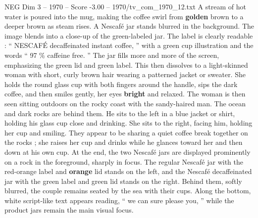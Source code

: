 \begin{textsample}{NEG Dim 3 – 1970 – Score -3.00 – 1970/tv\_com\_1970\_12.txt}
A stream of hot water is poured into the mug, making the coffee swirl from \textbf{golden} brown to a deeper brown as steam rises.
A Nescafé jar stands blurred in the background.
The image blends into a close-up of the green-labeled jar.
The label is clearly readable : “ NESCAFÉ decaffeinated instant coffee, ” with a green cup illustration and the words “ 97 \% caffeine free. ” The jar fills more and more of the screen, emphasizing the green lid and green label.
This then dissolves to a light-skinned woman with short, curly brown hair wearing a patterned jacket or sweater.
She holds the round glass cup with both fingers around the handle, sips the dark coffee, and then smiles gently, her eyes \textbf{bright} and relaxed.
The woman is then seen sitting outdoors on the rocky coast with the sandy-haired man.
The ocean and dark rocks are behind them.
He sits to the left in a blue jacket or shirt, holding his glass cup close and drinking.
She sits to the right, facing him, holding her cup and smiling.
They appear to be sharing a quiet coffee break together on the rocks ; she raises her cup and drinks while he glances toward her and then down at his own cup.
At the end, the two Nescafé jars are displayed prominently on a rock in the foreground, sharply in focus.
The regular Nescafé jar with the red-orange label and \textbf{orange} lid stands on the left, and the Nescafé decaffeinated jar with the green label and green lid stands on the right.
Behind them, softly blurred, the couple remains seated by the sea with their cups.
Along the bottom, white script-like text appears reading, “ we can sure please you, ” while the product jars remain the main visual focus.

\end{textsample}
